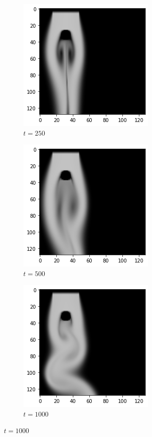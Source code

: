 \documentclass[a4paper,12pt,twoside]{report}
\begin{document}
\begin{figure}
	\centering
	\begin{subfigure}{0.18\textwidth}
		\centering
		\includegraphics[scale=0.3]{timecost/ref250.png}
		\caption{$t=250$}
	\end{subfigure}
	\begin{subfigure}{0.18\textwidth}
		\centering
		\includegraphics[scale=0.3]{timecost/ref500.png}
		\caption{$t=500$}
	\end{subfigure}
	\begin{subfigure}{0.18\textwidth}
		\centering
		\includegraphics[scale=0.3]{timecost/ref1000.png}
		\caption{$t=1000$}

\end{subfigure}
\end{figure}
\end{document}
